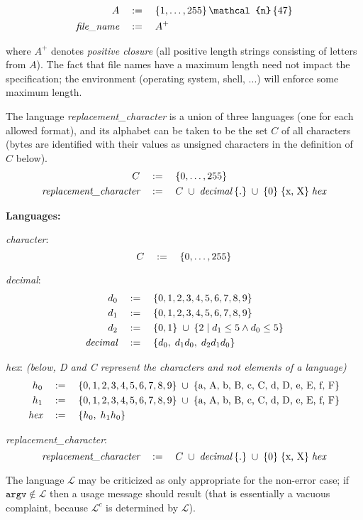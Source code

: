 \documentclass[12pt]{article}
\newcommand{\tab}{\hspace*{2em}}
\newcommand{\mtab}{\hspace*{1em}}
\newcommand{\es}[1] {\begin{equation*}#1\end{equation*}}
\newcommand{\as}[1] {\begin{align*}#1\end{align*}}
\newcommand{\adef}{&\mtab:=\mtab}
\newcommand{\cdef}{\mtab:=\mtab}
\begin{document}
\as{
    A \adef \{1, \dotsc, 255\} \, \mathcal{n} \, \{47\} \\
    \textit{file\_name} \adef A^+ 
}

where $ A^+ $ denotes \emph{positive closure} (all positive length strings consisting of letters 
from $ A $). The fact that file names have a maximum length need not impact the specification; 
the environment (operating system, shell, ...) will enforce some maximum length.


\newpage

The language \emph{replacement\_character} is a union of three languages (one for each allowed format), 
and its alphabet can be taken to be the set $ C $ of all characters (bytes are identified
with their values as unsigned characters in the definition of $ C $ below).
\as{
    C \adef \{0, \dots, 255\} \\
    \textit{replacement\_character} \adef C 
        \;\cup\; \textit{decimal} \: \{.\} 
        \;\cup\; \{0\} \;\{\text{x, X}\} \; \textit{hex}
}

\bigskip
\textbf{Languages:}

\tab \textit{character}:
    \es{ C \mtab := \mtab \{0, \dots, 255\} }

\tab \textit{decimal}:
    \as{
        d_0 \adef \{0, 1, 2, 3, 4, 5, 6, 7, 8, 9 \} \\
        d_1 \adef \{0, 1, 2, 3, 4, 5, 6, 7, 8, 9 \} \\
        d_2 \adef \{0, 1 \} \;\cup\; \{2 \;|\; d_1 \leq 5 \wedge d_0 \leq 5\} \\
        \textit{decimal} \adef  \{d_0,\; d_1 d_0,\; d_2 d_1 d_0\}
    }

\tab \textit{hex}: \textit{(below, D and C represent the characters and not elements of a language)}
    \as{
        h_0 \adef \{0, 1, 2, 3, 4, 5, 6, 7, 8, 9 \} \;\cup\; \{\text{a, A, b, B, c, C, d, D, e, E, f, F}\} \\
        h_1 \adef \{0, 1, 2, 3, 4, 5, 6, 7, 8, 9 \} \;\cup\; \{\text{a, A, b, B, c, C, d, D, e, E, f, F}\} \\
        \textit{hex} \adef \{h_0,\; h_1 h_0\}
    }

\tab \textit{replacement\_character}:
\es{    
    \textit{replacement\_character} \cdef C 
        \;\cup\; \textit{decimal} \: \{.\} 
        \;\cup\; \{0\} \;\{\text{x, X}\} \; \textit{hex}
}

\bigskip

The language $\mathcal{L}$ may be criticized as only appropriate for the non-error case; 
if $ \texttt{argv} \notin \mathcal{L} $ then a usage message should result (that is essentially 
a vacuous complaint, because $ \mathcal{L}^c $ is determined by $ \mathcal{L} $).
\end{document}
